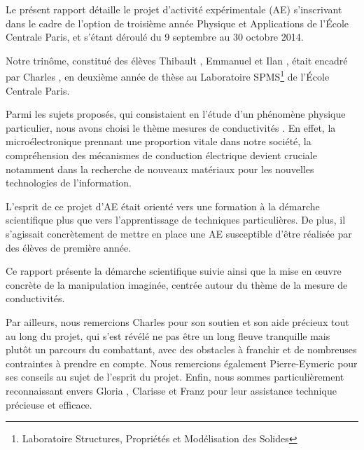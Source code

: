 Le présent rapport détaille le projet d'activité expérimentale (AE) s'inscrivant dans le cadre de l'option de troisième année 
\og Physique et Applications \fg{} de l'École Centrale Paris, et s'étant déroulé du 9 septembre au 30 octobre 2014.

\bigskip
Notre trinôme, constitué des élèves Thibault , Emmanuel  et Ilan , était encadré 
par Charles , en deuxième année de thèse au Laboratoire SPMS\footnote{Laboratoire Structures, 
Propriétés et Modélisation des Solides} de l'École Centrale Paris.

\bigskip
Parmi les sujets proposés, qui consistaient en l'étude d'un phénomène physique particulier, nous avons choisi le thème 
\og mesures de conductivités \fg. En effet, la microélectronique prennant une proportion vitale dans notre société, 
la compréhension des mécanismes de conduction électrique devient cruciale notamment dans 
la recherche de nouveaux matériaux pour les nouvelles technologies de l'information.

\bigskip
L'esprit de ce projet d'AE était orienté vers une formation à la démarche scientifique plus que vers l'apprentissage
de techniques particulières. De plus, il s'agissait concrètement de mettre en place une AE susceptible d'être réalisée
par des élèves de première année.

\bigskip
Ce rapport présente la démarche scientifique suivie ainsi que la mise en \oe uvre concrète de la manipulation
imaginée, centrée autour du thème de la mesure de conductivités.

\bigskip
Par ailleurs, nous remercions Charles  pour son soutien et son aide précieux tout au long du projet, 
qui s'est révélé ne pas être un long fleuve tranquille mais plutôt un parcours du combattant, avec des obstacles à
franchir et de nombreuses contraintes à prendre en compte. 
Nous remercions également Pierre-Eymeric  pour ses conseils au sujet de l'esprit du projet. 
Enfin, nous sommes particulièrement reconnaissant envers Gloria , Clarisse  et Franz 
 pour leur assistance technique précieuse et efficace.

